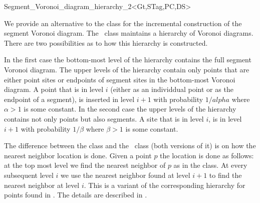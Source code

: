 


\begin{ccRefClass}{Segment_Voronoi_diagram_hierarchy_2<Gt,STag,PC,DS>}

\ccDefinition

We provide an alternative to the class
 for the incremental
construction of the segment Voronoi diagram. The \ccRefName\ class
maintains a hierarchy of Voronoi diagrams. There are two possibilities
as to how this hierarchy is constructed.

In the first case the bottom-most level of the hierarchy contains the
full segment Voronoi diagram. The upper levels of the hierarchy
contain only points that are either point sites or endpoints of
segment sites in the bottom-most Voronoi diagram. 
A point that is in level $i$ (either as an individdual point or as the
endpoint of a segment), is inserted in level $i+1$ with probability
$1/alpha$ where $\alpha>1$ is some constant.
In the second case the upper levels of the hierarchy contains not only
points but also segments. A site that is in level $i$, is in level
$i+1$ with probability $1/\beta$ where $\beta > 1$ is some constant.

The difference between the 
class and the \ccRefName\ class (both versions of it) is on how the
nearest neighbor location is done. Given a point $p$ the location is
done as follows: at the top most level we find the nearest neighbor of
$p$ as in the  class. At
every subsequent level $i$ we use the nearest neighbor found at level
$i+1$ to find the nearest neighbor at level $i$. This is a variant of
the corresponding hierarchy for points found in \cite{d-iirdt-98}. The
details are described in \cite{k-peasv-04}.


\end{ccRefClass}
